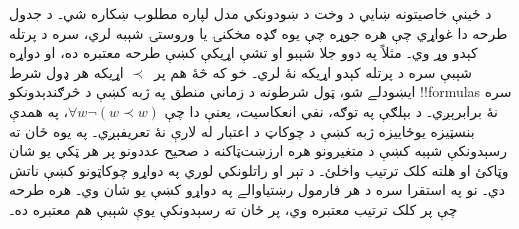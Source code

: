 \documentclass[../../../include/open-logic-section]{subfiles}
\begin{document}
د  ځينې خاصيتونه ښايي د وخت د ښودونکي
مدل لپاره مطلوب ښکاره شي۔ د جدول طرحه دا غواړي چې هره جوړه چې
يوه ګډه مخکنۍ يا وروستۍ شېبه لري، سره د پرتله کېدو وړ وي۔
مثلاً په دوو جلا شېبو او تشې اړيکې کښې طرحه معتبره ده،
او دواړه شېبې سره د پرتله کېدو اړيکه نۀ لري۔ خو که څۀ هم پر~$\prec$ اړيکه هر ډول
شرط ايښودلے شو، ټول شرطونه د زماني منطق په ژبه کښې د څرګندېدونکو
!!{formula}s سره نۀ برابرېږي۔ د بېلګې په توګه، نفي انعکاسيت،
يعنې دا چې $\forall w \lnot (w \prec w)$، په همدې بنسټيزه
يو‌ځاييزه ژبه کښې د چوکاټ د اعتبار له لارې نۀ تعريفېږي۔
په يوه ځان ته رسېدونکې شېبه کښې د متغيرونو هره ارزښت‌ټاکنه
د صحيح عددونو پر هر ټکي يو شان وټاکئ او هلته کلک ترتيب واخلئ۔
د تېر او راتلونکي لوري په دواړو چوکاټونو کښې ناتش دي۔ نو په
استقرا سره د هر فارمول رښتياوالے په دواړو کښې يو شان وي۔
هره طرحه چې پر کلک ترتيب معتبره وي، پر ځان ته رسېدونکې
يوې شېبې هم معتبره ده۔
\end{document}
